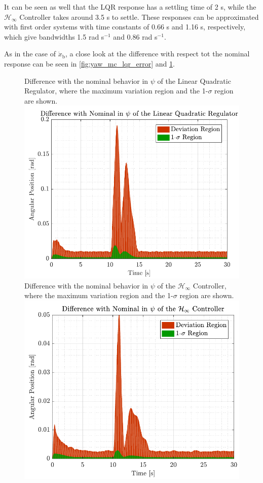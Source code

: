 It can be seen as well that the LQR response has a settling time of 2 s, while the $\mathcal{H}_\infty$ Controller takes around \num{3.5} s to settle. These responses can be approximated with first order systems with time constants of \num{0.66} s and \num{1.16} s, respectively, which give bandwidths \num{1.5} rad s$^{-1}$ and \num{0.86} rad s$^{-1}$.

As in the case of $\dot{x}_\mathrm{b}$, a close look at the difference with respect tot the nominal response can be seen in \autoref{fig:yaw_mc_lqr_error} and \ref{fig:yaw_mc_rob_error}.
\begin{figure}[H]
    \captionbox 
    {   
        Difference with the nominal behavior in $\psi$ of the Linear Quadratic Regulator, where the maximum variation region and the 1-$\sigma$ region are shown.
        \label{fig:yaw_mc_lqr_error}
    }                                                                 
    {                                                                  
        \includegraphics[width=.45\textwidth]{figures/yaw_mc_lqr_error}         
    }                                                                    
    \hspace{5pt}                                                          
    \captionbox  
    {   
        Difference with the nominal behavior in $\psi$ of the $\mathcal{H}_\infty$ Controller, where the maximum variation region and the 1-$\sigma$ region are shown.   
        \label{fig:yaw_mc_rob_error}
    }                                                                          
    {
        \includegraphics[width=.45\textwidth]{figures/yaw_mc_rob_error}
    }
\end{figure}


